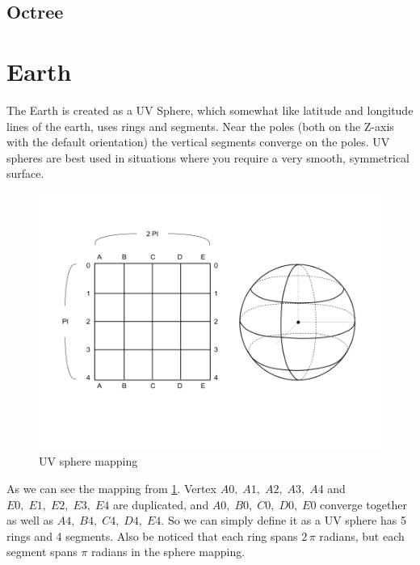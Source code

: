 \subsection{Octree}

\section{Earth}

The Earth is created as a UV Sphere, which somewhat like latitude and longitude lines of the earth, uses rings and segments. Near the poles (both on the Z-axis with the default orientation) the vertical segments converge on the poles. UV spheres are best used in situations where you require a very smooth, symmetrical surface.

\begin{figure}[H]
\caption[uv-sphere-mapping]{UV sphere mapping}
\label{fig:uv-sphere-mapping}
\centering
\includegraphics[width=\linewidth]{Figures/uv-sphere-mapping.png}
\decoRule
\end{figure}

As we can see the mapping from \ref{fig:uv-sphere-mapping}. Vertex $A0,\;A1,\;A2,\;A3,\;A4$ and $E0,\;E1,\;E2,\;E3,\;E4$ are duplicated, and $A0,\;B0,\;C0,\;D0,\;E0$ converge together as well as $A4,\;B4,\;C4,\;D4,\;E4$. So we can simply define it as a UV sphere has 5 rings and 4 segments. Also be noticed that each ring spans $2\,\pi$ radians, but each segment spans $\pi$ radians in the sphere mapping.

